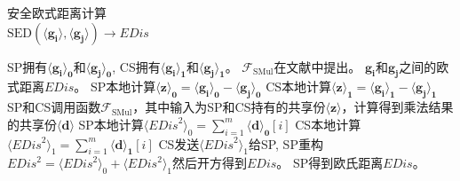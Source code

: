 \begin{algorithm}[htbp]
    \caption{安全欧式距离计算\\$\text{SED}(\boldsymbol{\langle g_i\rangle}, \boldsymbol{\langle g_j\rangle}) \xrightarrow{} \textit{EDis}$}
    \label{alg1}
    \begin{algorithmic}[1]
    \REQUIRE SP拥有$\boldsymbol{\langle g_i\rangle_0}$和$\boldsymbol{\langle g_j\rangle_0}$, CS拥有$\boldsymbol{\langle g_i\rangle_1}$和$\boldsymbol{\langle g_j\rangle_1}$。 $\mathcal{F}_{\text {SMul}}$在文献\cite{rathee2021sirnn}中提出。
    \ENSURE $\boldsymbol{g_i}$和$\boldsymbol{g_j}$之间的欧式距离$\textit{EDis}$。
    \STATE SP本地计算$\boldsymbol{\langle z\rangle_0} = \boldsymbol{\langle g_i\rangle_0} - \boldsymbol{\langle g_j\rangle_0}$
    \STATE CS本地计算$\boldsymbol{\langle z\rangle_1} = \boldsymbol{\langle g_i\rangle_1} - \boldsymbol{\langle g_j\rangle_1}$
    \STATE SP和CS调用函数$\mathcal{F}_{\text {SMul}}$，其中输入为SP和CS持有的共享份$\boldsymbol{\langle z\rangle}$，计算得到乘法结果的共享份$\boldsymbol{\langle d\rangle}$ 
    \STATE SP本地计算$\langle \textit{EDis}^2\rangle_0 = \sum_{i=1}^{m} \boldsymbol{\langle d\rangle_0}[i]$
    \STATE CS本地计算$\langle \textit{EDis}^2\rangle_1 = \sum_{i=1}^{m} \boldsymbol{\langle d\rangle_1}[i]$
    \STATE CS发送$\langle \textit{EDis}^2\rangle_1$给SP, SP重构$\textit{EDis}^2 = \langle \textit{EDis}^2\rangle_0 + \langle \textit{EDis}^2\rangle_1$然后开方得到$\textit{EDis}$。
    \RETURN SP得到欧氏距离$\textit{EDis}$。
    \end{algorithmic}
\end{algorithm}

